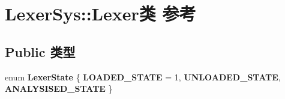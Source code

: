 \hypertarget{class_lexer_sys_1_1_lexer}{\section{Lexer\-Sys\-:\-:Lexer类 参考}
\label{class_lexer_sys_1_1_lexer}
}
\subsection*{Public 类型}
\begin{DoxyCompactItemize}
\item 
enum {\bfseries Lexer\-State} \{ {\bfseries L\-O\-A\-D\-E\-D\-\_\-\-S\-T\-A\-T\-E} = 1, 
{\bfseries U\-N\-L\-O\-A\-D\-E\-D\-\_\-\-S\-T\-A\-T\-E}, 
{\bfseries A\-N\-A\-L\-Y\-S\-I\-S\-E\-D\-\_\-\-S\-T\-A\-T\-E}
 \}
\end{DoxyCompactItemize}
